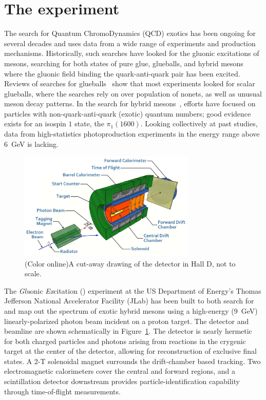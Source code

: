 \section[The \gx{} experiment]{\label{sec:gluexexperiment} The \gx{} experiment}
The search for Quantum ChromoDynamics (QCD) exotics has been ongoing for several decades and uses data from a wide range of experiments and production mechanisms. Historically, such searches have looked for the gluonic excitations of mesons, searching for both states of pure glue, glueballs, and hybrid mesons where the gluonic field binding the quark-anti-quark pair has been excited. Reviews of searches for glueballs~\cite{Crede:2008vw} show that most experiments looked for scalar glueballs, where the searches rely on over population of nonets, as well as unusual meson decay patterns. In the search for hybrid mesons~\cite{Meyer:2010ku,Meyer:2015eta}, efforts have focused on particles with non-quark-anti-quark (exotic) quantum numbers; good evidence exists for an isospin $1$ state, the $\pi_{1}(1600)$. Looking collectively at past studies, data from high-statistics photoproduction experiments in the energy range above $6$~GeV is lacking. 

\begin{figure}[hbt]\centering
\includegraphics[width=0.75\textwidth]{figures/GlueX-graphic.jpg}
\caption[]{\label{fig:gluex_cut-away}(Color online)A cut-away drawing of the \GX{} detector in Hall D, not to scale.}
\end{figure}
The \emph{Glu}onic \emph{Ex}citation (\gx{}) experiment at the 
US Department of Energy's Thomas Jefferson National Accelerator Facility (JLab) \cite{jlab-ref} has been built to both search for and map out the spectrum of exotic hybrid mesons using a high-energy (9~GeV) linearly-polarized photon beam incident on a proton target\cite{gluex-ref}. The \gx{} detector and beamline are shown schematically in Figure~\ref{fig:gluex_cut-away}. The detector is nearly hermetic for both charged particles and photons arising from reactions in the crygenic target at the center of the detector, allowing for reconstruction of exclusive final states. A 2-T solenoidal magnet surrounds the drift-chamber based tracking. Two electromagnetic calorimeters cover the central and forward regions, and a scintillation detector downstream provides particle-identification capability through time-of-flight measurements. 


